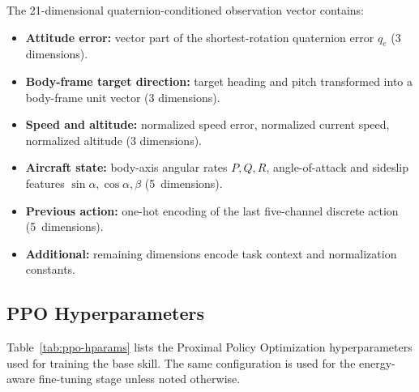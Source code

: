 \documentclass{article}
\begin{document}
The 21-dimensional quaternion-conditioned observation vector contains:

\begin{itemize}
  \item \textbf{Attitude error:} vector part of the shortest-rotation
        quaternion error $q_e$ (3 dimensions).
  \item \textbf{Body-frame target direction:} target heading and pitch
        transformed into a body-frame unit vector (3 dimensions).
  \item \textbf{Speed and altitude:} normalized speed error,
        normalized current speed, normalized altitude (3 dimensions).
  \item \textbf{Aircraft state:} body-axis angular rates $P,Q,R$,
        angle-of-attack and sideslip features $\sin\alpha,\cos\alpha,\beta$
        (5~dimensions).
  \item \textbf{Previous action:} one-hot encoding of the last five-channel
        discrete action (5~dimensions).
  \item \textbf{Additional:} remaining dimensions encode task context and
        normalization constants.
\end{itemize}

\subsection{PPO Hyperparameters}

Table~\ref{tab:ppo-hparams} lists the Proximal Policy Optimization
hyperparameters used for training the base skill.  The same configuration
is used for the energy-aware fine-tuning stage unless noted otherwise.
\end{document}
